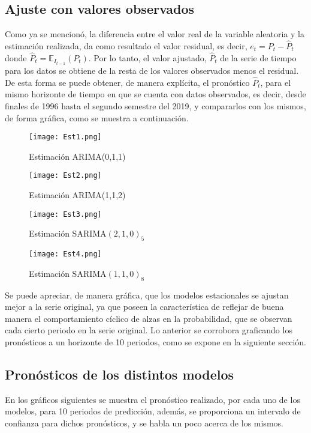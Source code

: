 \documentclass{article}
\theoremstyle{remark}
\begin{document}
\subsection{Ajuste con valores observados}
Como ya se mencionó, la diferencia entre el valor real de la variable aleatoria y la estimación realizada, da como resultado el valor residual, es decir, $e_t = P_t - \hat{P}_t$ donde $\hat{P}_t = \mathbb{E}_{I_{t-1}}(P_t)$. Por lo tanto, el valor ajustado, $\hat{P}_t$ de la serie de tiempo para los datos se obtiene de la resta de los valores observados menos el residual.\\

De esta forma se puede obtener, de manera explícita, el pronóstico $\hat{P}_t$, para el mismo horizonte de tiempo en que se cuenta con datos observados, es decir, desde finales de 1996 hasta el segundo semestre del 2019, y compararlos con los mismos, de forma gráfica, como se muestra a continuación.

\begin{figure}[H] 
\centering
\texttt{[image: Est1.png]}
\caption{Estimación ARIMA(0,1,1)}
\label{Est1}
\end{figure}

\begin{figure}[H] 
\centering
\texttt{[image: Est2.png]}
\caption{Estimación ARIMA(1,1,2)}
\label{Est2}
\end{figure}

\begin{figure}[H] 
\centering
\texttt{[image: Est3.png]}
\caption{Estimación SARIMA\((2,1,0)_5\)}
\label{Est3}
\end{figure}

\begin{figure}[H] 
\centering
\texttt{[image: Est4.png]}
\caption{Estimación SARIMA\((1,1,0)_8\)}
\label{Est4}
\end{figure}
Se puede apreciar, de manera gráfica, que los modelos estacionales se ajustan mejor a la serie original, ya que poseen la característica de reflejar de buena manera el comportamiento cíclico de alzas en la probabilidad, que se observan cada cierto periodo en la serie original. Lo anterior se corrobora graficando los pronósticos a un horizonte de 10 periodos, como se expone en la siguiente sección.
\newpage
\subsection{Pronósticos de los distintos modelos}
En los gráficos siguientes se muestra el pronóstico realizado, por cada uno de los modelos, para 10 periodos de predicción, además, se proporciona un intervalo de confianza para dichos pronósticos, y se habla un poco acerca de los mismos.\\
\end{document}
